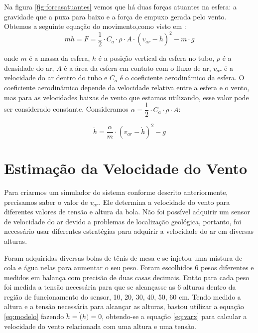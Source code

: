 Na figura \ref{fig:forcasatuantes} vemos que há duas forças atuantes na esfera: a gravidade que a puxa para baixo e a força de empuxo gerada pelo vento. Obtemos a seguinte equação do movimento,como visto em \cite{jernigan2009}:
\begin{equation}
m \ddot{h}=F=\dfrac{1}{2} \cdot C_a \cdot\rho \cdot A \cdot (v_{ar}- \dot{h})^2-m\cdot g
\end{equation}

onde $m$ é a massa da esfera, $h$ é a posição vertical da esfera no tubo, $\rho$ é a densidade do ar, $A$ é a área da esfera em contato com o fluxo de ar, $v_{ar}$ é a velocidade do ar dentro do tubo e $C_a$ é o coeficiente aerodinâmico da esfera. O coeficiente aerodinâmico depende da velocidade relativa entre a esfera e o vento, mas para as velocidades baixas de vento que estamos utilizando, esse valor pode ser considerado constante. Consideramos $\alpha= \dfrac{1}{2} \cdot C_a \cdot \rho \cdot A$:


\begin{equation} \label{eq:modelo}
\ddot{h}=\dfrac{\alpha}{m}\cdot (v_{ar}-\dot{h})^2-g
\end{equation}

\section{Estimação da Velocidade do Vento}

Para criarmos um simulador do sistema conforme descrito anteriormente, precisamos saber o valor de $v_{ar}$. Ele determina a velocidade do vento para diferentes valores de tensão e altura da bola. Não foi possível adquirir um sensor de velocidade do ar devido a problemas de localização geológica, portanto, foi necessário usar diferentes estratégias para adquirir a velocidade do ar em diversas alturas.


Foram adquiridas diversas bolas de tênis de mesa e se injetou uma mistura de cola e água nelas para aumentar o seu peso. Foram escolhidos 6 pesos diferentes e medidos em balança com precisão de duas casas decimais. Então para cada peso foi medida a tensão necessária para que se alcançasse as 6 alturas dentro da região de funcionamento do sensor, 10, 20, 30, 40, 50, 60 cm. Tendo medido a altura e a tensão necessária para alcançar as alturas, bastou utilizar a equação \eqref{eq:modelo} fazendo $\ddot{h}=\dot(h)=0$, obtendo-se a equação \ref{eq:varx} para calcular a velocidade do vento relacionada com uma altura e uma tensão.

